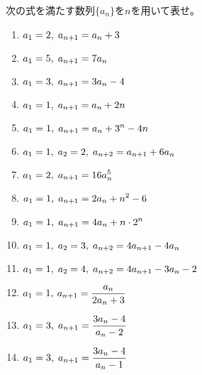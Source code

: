 \documentclass[a4paper]{ltjsarticle}
\begin{document}
\begin{question*}
  次の式を満たす数列$\{a_n\}$を$n$を用いて表せ。
\begin{enumerate}[label=\arabic*.]

  \item $\displaystyle a_1 = 2,\; a_{n+1} = a_n + 3$\\

  \item $\displaystyle a_1 = 5,\; a_{n+1} = 7a_n$\\

  \item $\displaystyle a_1 = 3,\; a_{n+1} = 3a_n -4$\\

  \item $\displaystyle a_1 = 1,\; a_{n+1} = a_n + 2n$\\

  \item $\displaystyle a_1 = 1,\; a_{n+1} = a_n + 3^n - 4n$\\

  \item $\displaystyle a_1 = 1,\; a_2 = 2,\; a_{n+2} = a_{n+1} + 6a_n$\\

  \item $\displaystyle a_1 = 2,\; a_{n+1} = 16a_n^5$\\

  \item $\displaystyle a_1 = 1,\; a_{n+1} = 2a_n + n^2 -6$\\

  \item $\displaystyle a_1 = 1,\; a_{n+1} = 4a_n + n\cdot 2^n$\\

  \item $\displaystyle a_1 = 1,\; a_2 = 3,\; a_{n+2} = 4a_{n+1} - 4a_n$\\

  \item $\displaystyle a_1 = 1,\; a_2 = 4,\; a_{n+2} = 4a_{n+1} - 3a_n - 2$\\

  \item $\displaystyle a_1 = 1,\: a_{n+1} = \frac{a_n}{2a_n + 3}$\\

  \item $\displaystyle a_1 = 3,\; a_{n+1} = \frac{3a_n-4}{a_n-2}$\\

  \item $\displaystyle a_1 = 3,\; a_{n+1} = \frac{3a_n-4}{a_n-1}$\\


\end{enumerate}
\end{question*}
\end{document}
